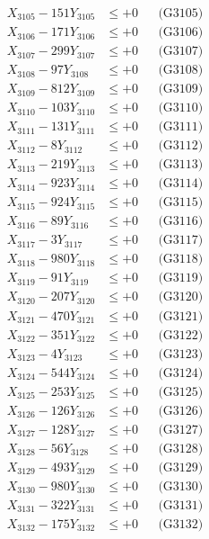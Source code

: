 \documentclass[a4paper,10pt]{article}
\begin{document}
{\begin{align}
X_{3105} - 151Y_{3105} &\leq +0 && \text{(G3105)} \\
X_{3106} - 171Y_{3106} &\leq +0 && \text{(G3106)} \\
X_{3107} - 299Y_{3107} &\leq +0 && \text{(G3107)} \\
X_{3108} - 97Y_{3108} &\leq +0 && \text{(G3108)} \\
X_{3109} - 812Y_{3109} &\leq +0 && \text{(G3109)} \\
X_{3110} - 103Y_{3110} &\leq +0 && \text{(G3110)} \\
\allowbreak
X_{3111} - 131Y_{3111} &\leq +0 && \text{(G3111)} \\
X_{3112} - 8Y_{3112} &\leq +0 && \text{(G3112)} \\
X_{3113} - 219Y_{3113} &\leq +0 && \text{(G3113)} \\
X_{3114} - 923Y_{3114} &\leq +0 && \text{(G3114)} \\
X_{3115} - 924Y_{3115} &\leq +0 && \text{(G3115)} \\
X_{3116} - 89Y_{3116} &\leq +0 && \text{(G3116)} \\
X_{3117} - 3Y_{3117} &\leq +0 && \text{(G3117)} \\
X_{3118} - 980Y_{3118} &\leq +0 && \text{(G3118)} \\
X_{3119} - 91Y_{3119} &\leq +0 && \text{(G3119)} \\
X_{3120} - 207Y_{3120} &\leq +0 && \text{(G3120)} \\
\allowbreak
X_{3121} - 470Y_{3121} &\leq +0 && \text{(G3121)} \\
X_{3122} - 351Y_{3122} &\leq +0 && \text{(G3122)} \\
X_{3123} - 4Y_{3123} &\leq +0 && \text{(G3123)} \\
X_{3124} - 544Y_{3124} &\leq +0 && \text{(G3124)} \\
X_{3125} - 253Y_{3125} &\leq +0 && \text{(G3125)} \\
X_{3126} - 126Y_{3126} &\leq +0 && \text{(G3126)} \\
X_{3127} - 128Y_{3127} &\leq +0 && \text{(G3127)} \\
X_{3128} - 56Y_{3128} &\leq +0 && \text{(G3128)} \\
X_{3129} - 493Y_{3129} &\leq +0 && \text{(G3129)} \\
X_{3130} - 980Y_{3130} &\leq +0 && \text{(G3130)} \\
\allowbreak
X_{3131} - 322Y_{3131} &\leq +0 && \text{(G3131)} \\
X_{3132} - 175Y_{3132} &\leq +0 && \text{(G3132)} \\

\end{align}}
\end{document}
